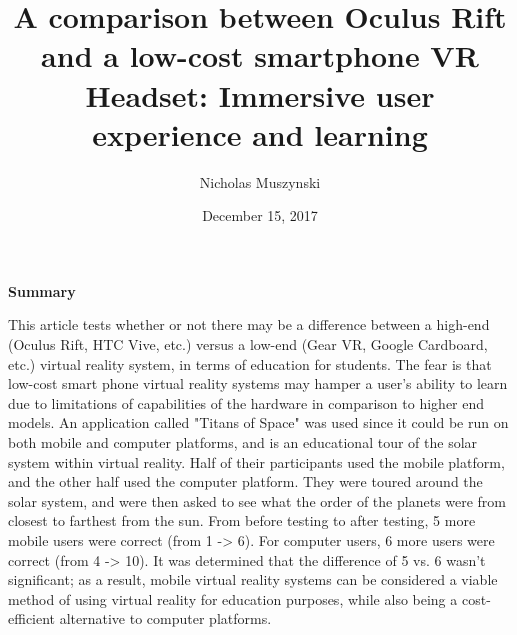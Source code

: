 \documentclass{article}
\begin{document}
\title{A comparison between Oculus Rift and a low-cost smartphone VR Headset: Immersive user experience and learning}
\author{Nicholas Muszynski}
\date{December 15, 2017}

\maketitle

\textbf{Summary}
\newline

This article tests whether or not there may be a difference between a high-end (Oculus Rift, HTC Vive, etc.) versus a low-end (Gear VR, Google Cardboard, etc.) virtual reality system, in terms of education for students. The fear is that low-cost smart phone virtual reality systems may hamper a user's ability to learn due to limitations of capabilities of the hardware in comparison to higher end models. An application called "Titans of Space" was used since it could be run on both mobile and computer platforms, and is an educational tour of the solar system within virtual reality. Half of their participants used the mobile platform, and the other half used the computer platform. They were toured around the solar system, and were then asked to see what the order of the planets were from closest to farthest from the sun. From before testing to after testing, 5 more mobile users were correct (from 1 -> 6). For computer users, 6 more users were correct (from 4 -> 10). It was determined that the difference of 5 vs. 6 wasn't significant; as a result, mobile virtual reality systems can be considered a viable method of using virtual reality for education purposes, while also being a cost-efficient alternative to computer platforms.

\nocite{comparisonCite}



\end{document}
